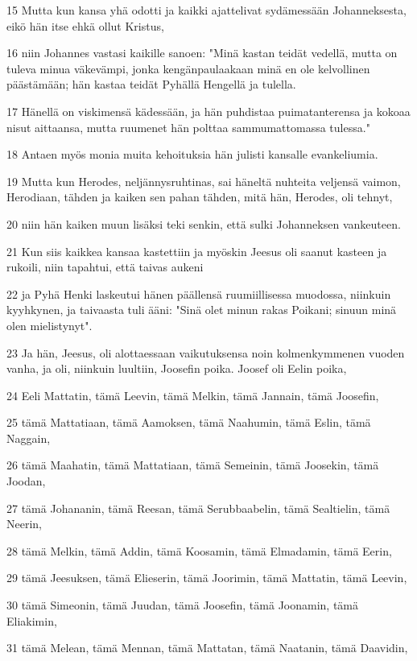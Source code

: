 \par 15 Mutta kun kansa yhä odotti ja kaikki ajattelivat sydämessään Johanneksesta, eikö hän itse ehkä ollut Kristus,
\par 16 niin Johannes vastasi kaikille sanoen: "Minä kastan teidät vedellä, mutta on tuleva minua väkevämpi, jonka kengänpaulaakaan minä en ole kelvollinen päästämään; hän kastaa teidät Pyhällä Hengellä ja tulella.
\par 17 Hänellä on viskimensä kädessään, ja hän puhdistaa puimatanterensa ja kokoaa nisut aittaansa, mutta ruumenet hän polttaa sammumattomassa tulessa."
\par 18 Antaen myös monia muita kehoituksia hän julisti kansalle evankeliumia.
\par 19 Mutta kun Herodes, neljännysruhtinas, sai häneltä nuhteita veljensä vaimon, Herodiaan, tähden ja kaiken sen pahan tähden, mitä hän, Herodes, oli tehnyt,
\par 20 niin hän kaiken muun lisäksi teki senkin, että sulki Johanneksen vankeuteen.
\par 21 Kun siis kaikkea kansaa kastettiin ja myöskin Jeesus oli saanut kasteen ja rukoili, niin tapahtui, että taivas aukeni
\par 22 ja Pyhä Henki laskeutui hänen päällensä ruumiillisessa muodossa, niinkuin kyyhkynen, ja taivaasta tuli ääni: "Sinä olet minun rakas Poikani; sinuun minä olen mielistynyt".
\par 23 Ja hän, Jeesus, oli alottaessaan vaikutuksensa noin kolmenkymmenen vuoden vanha, ja oli, niinkuin luultiin, Joosefin poika. Joosef oli Eelin poika,
\par 24 Eeli Mattatin, tämä Leevin, tämä Melkin, tämä Jannain, tämä Joosefin,
\par 25 tämä Mattatiaan, tämä Aamoksen, tämä Naahumin, tämä Eslin, tämä Naggain,
\par 26 tämä Maahatin, tämä Mattatiaan, tämä Semeinin, tämä Joosekin, tämä Joodan,
\par 27 tämä Johananin, tämä Reesan, tämä Serubbaabelin, tämä Sealtielin, tämä Neerin,
\par 28 tämä Melkin, tämä Addin, tämä Koosamin, tämä Elmadamin, tämä Eerin,
\par 29 tämä Jeesuksen, tämä Elieserin, tämä Joorimin, tämä Mattatin, tämä Leevin,
\par 30 tämä Simeonin, tämä Juudan, tämä Joosefin, tämä Joonamin, tämä Eliakimin,
\par 31 tämä Melean, tämä Mennan, tämä Mattatan, tämä Naatanin, tämä Daavidin,
